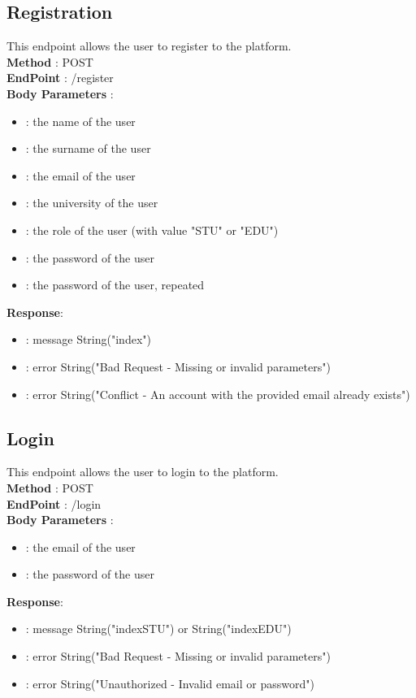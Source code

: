 \subsection*{Registration}
This endpoint allows the user to register to the platform.\\
\textbf{Method} : POST \\
\textbf{EndPoint} : /register \\
\textbf{Body Parameters} :
\begin{itemize}
    \item {} : the name of the user
    \item {} : the surname of the user
    \item {} : the email of the user
    \item {} : the university of the user
    \item {} : the role of the user (with value "STU" or "EDU")
    \item {} : the password of the user
    \item {} : the password of the user, repeated
\end{itemize}
\textbf{Response}:
\begin{itemize}
    \item {} : message String("index")
    \item {} : error String("Bad Request - Missing or invalid parameters")
    \item {} : error String("Conflict - An account with the provided email already exists")
\end{itemize}

\subsection*{Login}
This endpoint allows the user to login to the platform.\\
\textbf{Method} : POST \\
\textbf{EndPoint} : /login \\
\textbf{Body Parameters} :
\begin{itemize}
    \item {} : the email of the user
    \item {} : the password of the user
\end{itemize}
\textbf{Response}:
\begin{itemize}
    \item {} : message String("indexSTU") or String("indexEDU")
    \item {} : error String("Bad Request - Missing or invalid parameters")
    \item {} : error String("Unauthorized - Invalid email or password")
\end{itemize}

